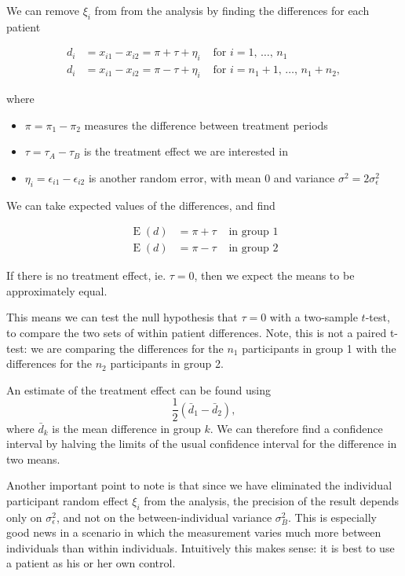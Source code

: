\documentclass[
  openany]{book}
\providecommand{\tightlist}{%
  \setlength{\itemsep}{0pt}\setlength{\parskip}{0pt}}
\theoremstyle{definition}
\theoremstyle{definition}
\theoremstyle{definition}
\theoremstyle{definition}
\theoremstyle{remark}
\begin{document}
We can remove \(\xi_i\) from from the analysis by finding the differences for each patient

\begin{align*}
d_i & = x_{i1} - x_{i2} = \pi + \tau + \eta_i& \text{ for } i=1,\,\ldots,\,n_1\\
d_i & = x_{i1} - x_{i2} = \pi - \tau + \eta_i& \text{ for } i=n_1+1,\,\ldots,\,n_1+n_2,
\end{align*}

where

\begin{itemize}
\tightlist
\item
  \(\pi=\pi_1 - \pi_2\) measures the difference between treatment periods
\item
  \(\tau = \tau_A - \tau_B\) is the treatment effect we are interested in
\item
  \(\eta_i = \epsilon_{i1} - \epsilon_{i2}\) is another random error, with mean 0 and variance \(\sigma^2=2\sigma^2_{\epsilon}\)
\end{itemize}

We can take expected values of the differences, and find

\begin{align*}
\operatorname{E}\left(d\right) & = \pi+\tau & \text{ in group 1}\\
\operatorname{E}\left(d\right) & = \pi-\tau & \text{ in group 2}
\end{align*}

If there is no treatment effect, ie. \(\tau=0\), then we expect the means to be approximately equal.

This means we can test the null hypothesis that \(\tau=0\) with a two-sample \(t\)-test, to compare the two sets of within patient differences. Note, this is not a paired t-test: we are comparing the differences for the \(n_1\) participants in group 1 with the differences for the \(n_2\) participants in group 2.

An estimate of the treatment effect can be found using
\[\frac{1}{2}\left(\bar{d}_1 - \bar{d}_2\right),\]
where \(\bar{d}_k\) is the mean difference in group \(k\). We can therefore find a confidence interval by halving the limits of the usual confidence interval for the difference in two means.

Another important point to note is that since we have eliminated the individual participant random effect \(\xi_i\) from the analysis, the precision of the result depends only on \(\sigma^2_{\epsilon}\), and not on the between-individual variance \(\sigma^2_B\). This is especially good news in a scenario in which the measurement varies much more between individuals than within individuals. Intuitively this makes sense: it is best to use a patient as his or her own control.
\end{document}
